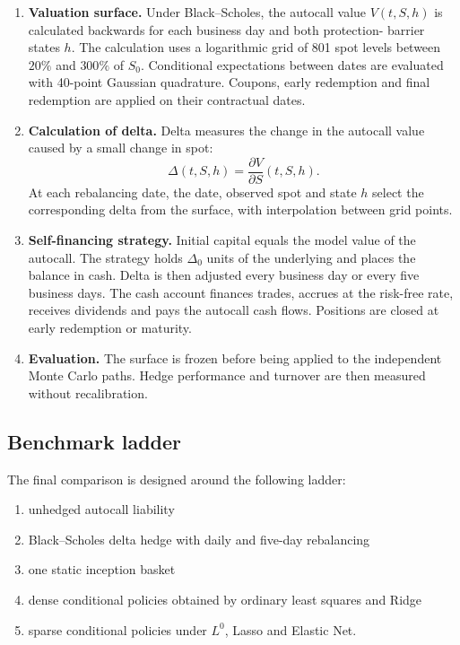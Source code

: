 \documentclass[12pt,a4paper]{article}
\newcommand{\1}{\mathbf{1}}
\begin{document}
\begin{enumerate}
\item \textbf{Valuation surface.} Under Black--Scholes, the autocall value
$V(t,S,h)$ is calculated backwards for each business day and both protection-
barrier states $h$. The calculation uses a logarithmic grid of 801 spot levels
between $20\%$ and $300\%$ of $S_0$. Conditional expectations between dates are
evaluated with 40-point Gaussian quadrature. Coupons, early redemption and final
redemption are applied on their contractual dates.

\item \textbf{Calculation of delta.} Delta measures the change in the autocall
value caused by a small change in spot:
\begin{equation}
  \Delta(t,S,h)=\frac{\partial V}{\partial S}(t,S,h).
\label{eq:delta-benchmark}
\end{equation}
At each rebalancing date, the date, observed spot and state $h$ select the
corresponding delta from the surface, with interpolation between grid points.

\item \textbf{Self-financing strategy.} Initial capital equals the model value
of the autocall. The strategy holds $\Delta_0$ units of the underlying and places
the balance in cash. Delta is then adjusted every business day or every five
business days. The cash account finances trades, accrues at the risk-free rate,
receives dividends and pays the autocall cash flows. Positions are closed at
early redemption or maturity.

\item \textbf{Evaluation.} The surface is frozen before being applied to the
independent Monte Carlo paths. Hedge performance and turnover are then measured
without recalibration.
\end{enumerate}

\subsection{Benchmark ladder}

The final comparison is designed around the following ladder:

\begin{enumerate}
\item unhedged autocall liability
\item Black--Scholes delta hedge with daily and five-day rebalancing
\item one static inception basket
\item dense conditional policies obtained by ordinary least squares and Ridge
\item sparse conditional policies under $L^0$, Lasso and Elastic Net.
\end{enumerate}
\end{document}
